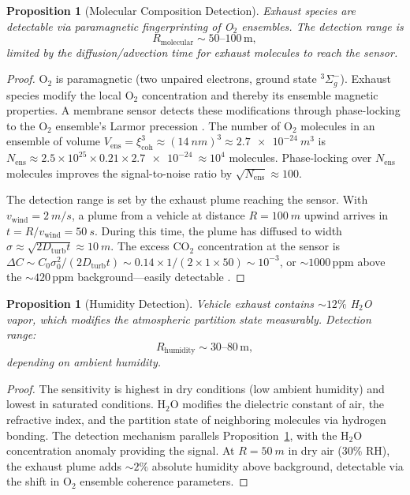 \documentclass[11pt,twocolumn,a4paper]{article}
\theoremstyle{plain}
\newtheorem{proposition}[theorem]{Proposition}
\theoremstyle{definition}
\theoremstyle{remark}
\newcommand{\xicoh}{\xi_{\mathrm{coh}}}
\newcommand{\Nens}{N_{\mathrm{ens}}}
\newcommand{\Dturb}{D_{\mathrm{turb}}}
\begin{document}
\begin{proposition}[Molecular Composition Detection]
\label{prop:molecular_detection}
Exhaust species are detectable via paramagnetic fingerprinting of O$_2$ ensembles. The detection range is
\begin{equation}
R_{\mathrm{molecular}} \sim 50\text{--}100\,\text{m},
\label{eq:R_molecular}
\end{equation}
limited by the diffusion/advection time for exhaust molecules to reach the sensor.
\end{proposition}

\begin{proof}
O$_2$ is paramagnetic (two unpaired electrons, ground state $^3\Sigma_g^-$). Exhaust species modify the local O$_2$ concentration and thereby its ensemble magnetic properties. A membrane sensor detects these modifications through phase-locking to the O$_2$ ensemble's Larmor precession \cite{sachikonye2026gas}. The number of O$_2$ molecules in an ensemble of volume $V_{\mathrm{ens}} = \xicoh^3 \approx (\SI{14}{nm})^3 \approx \SI{2.7e-24}{m^3}$ is $\Nens \approx 2.5\times 10^{25} \times 0.21 \times \SI{2.7e-24}{} \approx 10^4$ molecules. Phase-locking over $\Nens$ molecules improves the signal-to-noise ratio by $\sqrt{\Nens} \approx 100$.

The detection range is set by the exhaust plume reaching the sensor. With $v_{\mathrm{wind}} = \SI{2}{m/s}$, a plume from a vehicle at distance $R = \SI{100}{m}$ upwind arrives in $t = R/v_{\mathrm{wind}} = \SI{50}{s}$. During this time, the plume has diffused to width $\sigma \approx \sqrt{2\Dturb t} \approx \SI{10}{m}$. The excess CO$_2$ concentration at the sensor is $\Delta C \sim C_0 \sigma_0^2/(2\Dturb t) \sim 0.14 \times 1/(2 \times 1 \times 50) \sim 10^{-3}$, or $\sim 1000$\,ppm above the $\sim 420$\,ppm background---easily detectable \cite{seinfeld2016atmospheric}.
\end{proof}

\begin{proposition}[Humidity Detection]
\label{prop:humidity}
Vehicle exhaust contains $\sim 12\%$ H$_2$O vapor, which modifies the atmospheric partition state measurably. Detection range:
\begin{equation}
R_{\mathrm{humidity}} \sim 30\text{--}80\,\text{m},
\label{eq:R_humidity}
\end{equation}
depending on ambient humidity.
\end{proposition}

\begin{proof}
The sensitivity is highest in dry conditions (low ambient humidity) and lowest in saturated conditions. H$_2$O modifies the dielectric constant of air, the refractive index, and the partition state of neighboring molecules via hydrogen bonding. The detection mechanism parallels Proposition~\ref{prop:molecular_detection}, with the H$_2$O concentration anomaly providing the signal. At $R = \SI{50}{m}$ in dry air (30\% RH), the exhaust plume adds $\sim 2\%$ absolute humidity above background, detectable via the shift in O$_2$ ensemble coherence parameters.
\end{proof}
\end{document}
